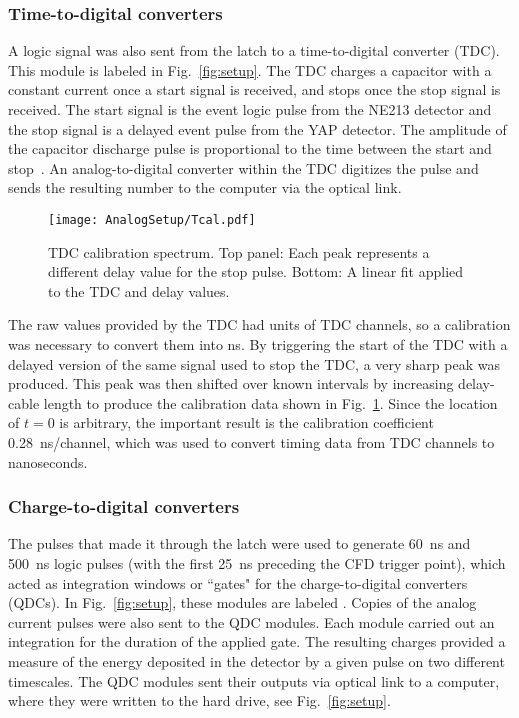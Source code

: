 \documentclass[main.tex]{subfiles}
\begin{document}
\subsubsection{Time-to-digital converters}
A logic signal was also sent from the latch to a time-to-digital converter (TDC). This module is labeled  in Fig.~\ref{fig:setup}. The TDC charges a capacitor with a constant current once a start signal is received, and stops once the stop signal is received. The start signal is the event logic pulse from the NE213 detector and the stop signal is a delayed event pulse from the YAP detector. The amplitude of the capacitor discharge pulse is proportional to the time between the start and stop~\cite{CAENTDC}. An analog-to-digital converter within the TDC digitizes the pulse and sends the resulting number to the computer via the optical link.
\begin{figure}[h]
	\centering
    	\texttt{[image: AnalogSetup/Tcal.pdf]}
        \caption[TDC calibration spectrum.]{TDC calibration spectrum. Top panel: Each peak represents a different delay value for the stop pulse. Bottom: A linear fit applied to the TDC and delay values.}
	    \label{fig:Tcal} 
\end{figure}

The raw values provided by the TDC had units of TDC channels, so a calibration was necessary to convert them into ns. By triggering the start of the TDC with a delayed version of the same signal used to stop the TDC, a very sharp peak was produced. This peak was then shifted over known intervals by increasing delay-cable length to produce the calibration data shown in Fig.~\ref{fig:Tcal}. Since the location of $t=0$ is arbitrary, the important result is the calibration coefficient \SI{0.28}{\nano\second/channel}, which was used to convert timing data from TDC channels to nanoseconds.

\subsubsection{Charge-to-digital converters}\label{sec:Ecal_A}
The pulses that made it through the latch were used to generate \SI{60}{\ns} and \SI{500}{\ns} logic pulses (with the first \SI{25}{\ns} preceding the CFD trigger point), which acted as integration windows or ``gates" for the charge-to-digital converters (QDCs). In Fig.~\ref{fig:setup}, these modules are labeled . Copies of the analog current pulses were also sent to the QDC modules. Each module carried out an integration for the duration of the applied gate. The resulting charges provided a measure of the energy deposited in the detector by a given pulse on two different timescales. The QDC modules sent their outputs via optical link to a computer, where they were written to the hard drive, see Fig.~\ref{fig:setup}.
\end{document}
